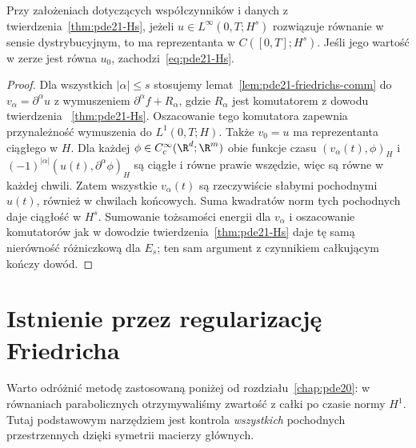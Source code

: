 \begin{wniosek}
Przy założeniach dotyczących współczynników i danych
z twierdzenia~\ref{thm:pde21-Hs}, jeżeli
$u\in L^\infty(0,T;H^s)$ rozwiązuje równanie
w sensie dystrybucyjnym, to ma reprezentanta
w $C([0,T];H^s)$. Jeśli jego wartość w zerze
jest równa $u_0$, zachodzi~\eqref{eq:pde21-Hs}.
\end{wniosek}
\begin{proof}
Dla wszystkich $|\alpha|\le s$ stosujemy
lemat~\ref{lem:pde21-friedrichs-comm} do
$v_\alpha=\partial^\alpha u$ z wymuszeniem
$\partial^\alpha f+R_\alpha$, gdzie $R_\alpha$
jest komutatorem z dowodu twierdzenia
~\ref{thm:pde21-Hs}. Oszacowanie tego komutatora
zapewnia przynależność wymuszenia do $L^1(0,T;H)$.
Także $v_0=u$ ma reprezentanta ciągłego w $H$.
Dla każdej $\phi\in C_c^\infty(\R^d;\R^m)$
obie funkcje czasu $(v_\alpha(t),\phi)_H$ i
$(-1)^{|\alpha|}(u(t),\partial^\alpha\phi)_H$
są ciągłe i równe prawie wszędzie, więc są równe
w każdej chwili. Zatem wszystkie $v_\alpha(t)$
są rzeczywiście słabymi pochodnymi $u(t)$,
również w chwilach końcowych. Suma kwadratów norm
tych pochodnych daje ciągłość w $H^s$.
Sumowanie tożsamości energii dla $v_\alpha$
i oszacowanie komutatorów jak w dowodzie
twierdzenia~\ref{thm:pde21-Hs} daje tę samą
nierówność różniczkową dla $E_s$; ten sam
argument z czynnikiem całkującym kończy dowód.
\end{proof}

\section{Istnienie przez regularizację Friedricha}
Warto odróżnić metodę zastosowaną poniżej od rozdziału~\ref{chap:pde20}:
w równaniach parabolicznych otrzymywaliśmy zwartość z całki po czasie
normy $H^1$. Tutaj podstawowym narzędziem jest kontrola \emph{wszystkich}
pochodnych przestrzennych dzięki symetrii macierzy głównych.

